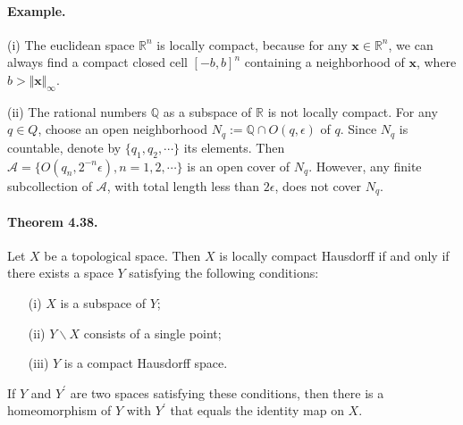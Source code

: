 \documentclass{article}
\numberwithin{equation}{section}
\theoremstyle{plain}
\theoremstyle{definition}
\begin{document}
\paragraph{Example.} (i) The euclidean space $\mathbb{R}^n$ is locally compact, because for any $\mathbf{x}\in\mathbb{R}^n$, we can always find a compact closed cell $[-b,b]^n$ containing a neighborhood of $\mathbf{x}$, where $b>\Vert\mathbf{x}\Vert_\infty$.

(ii) The rational numbers $\mathbb{Q}$ as a subspace of $\mathbb{R}$ is not locally compact. For any $q\in Q$, choose an open neighborhood $N_q:=\mathbb{Q}\cap O(q,\epsilon)$ of $q$. Since $N_q$ is countable, denote by $\{q_1,q_2,\cdots\}$ its elements. Then $\mathscr{A} = \{O(q_n,2^{-n}\epsilon),n=1,2,\cdots\}$ is an open cover of $N_q$. However, any finite subcollection of $\mathscr{A}$, with total length less than $2\epsilon$, does not cover $N_q$.

\paragraph{Theorem 4.38.\label{thm:4.38}} Let $X$ be a topological space. Then $X$ is locally compact Hausdorff if and only if there exists a space $Y$ satisfying the following conditions:
\begin{itemize}
	\item[(i)] $X$ is a subspace of $Y$;
	\item[(ii)] $Y\backslash X$ consists of a single point;
	\item[(iii)] $Y$ is a compact Hausdorff space.
\end{itemize}
If $Y$ and $Y^\prime$ are two spaces satisfying these conditions, then there is a homeomorphism of $Y$ with $Y^\prime$ that equals the identity map on $X$.
\end{document}
